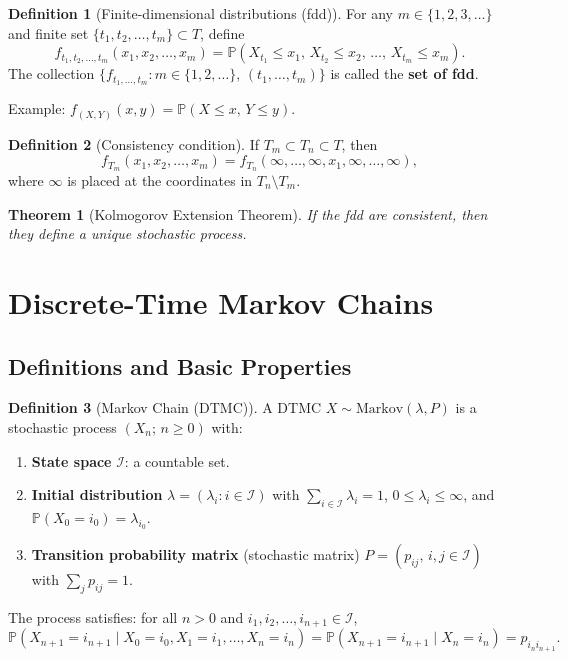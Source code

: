 \documentclass[12pt, a4paper]{article}
\theoremstyle{definition}
\newtheorem{definition}{Definition}[section]
\theoremstyle{plain}
\newtheorem{theorem}{Theorem}[section]
\newcommand{\PP}{\mathbb{P}}
\newcommand{\II}{\mathcal{I}}
\begin{document}
\begin{definition}[Finite-dimensional distributions (fdd)]
For any $m \in \{1,2,3,\ldots\}$ and finite set $\{t_1, t_2, \ldots, t_m\} \subset T$, define
\begin{equation*}
  f_{t_1,t_2,\ldots,t_m}(x_1,x_2,\ldots,x_m) = \PP(X_{t_1} \le x_1,\, X_{t_2} \le x_2,\,\ldots,\, X_{t_m} \le x_m).
\end{equation*}
The collection $\{f_{t_1,\ldots,t_m} : m \in \{1,2,\ldots\},\, (t_1,\ldots,t_m)\}$ is called the \textbf{set of fdd}.

Example: $f_{(X,Y)}(x,y) = \PP(X \le x,\, Y \le y)$.
\end{definition}

\begin{definition}[Consistency condition]
If $T_m \subset T_n \subset T$, then
\begin{equation*}
  f_{T_m}(x_1,x_2,\ldots,x_m) = f_{T_n}(\infty,\ldots,\infty,x_1,\infty,\ldots,\infty),
\end{equation*}
where $\infty$ is placed at the coordinates in $T_n \setminus T_m$.
\end{definition}

\begin{theorem}[Kolmogorov Extension Theorem]
If the fdd are consistent, then they define a unique stochastic process.
\end{theorem}

\section{Discrete-Time Markov Chains}
\subsection{Definitions and Basic Properties}

\begin{definition}[Markov Chain (DTMC)]
A DTMC $X \sim \text{Markov}(\lambda, P)$ is a stochastic process $(X_n;\, n \ge 0)$ with:
\begin{enumerate}[label=(\roman*)]
  \item \textbf{State space} $\II$: a countable set.
  \item \textbf{Initial distribution} $\lambda = (\lambda_i : i \in \II)$ with $\sum_{i \in \II} \lambda_i = 1$, $0 \le \lambda_i \le \infty$, and $\PP(X_0 = i_0) = \lambda_{i_0}$.
  \item \textbf{Transition probability matrix} (stochastic matrix) $P = (p_{ij},\, i,j \in \II)$ with $\sum_j p_{ij} = 1$.
\end{enumerate}
The process satisfies: for all $n > 0$ and $i_1, i_2, \ldots, i_{n+1} \in \II$,
\begin{equation*}
  \PP(X_{n+1} = i_{n+1} \mid X_0 = i_0, X_1 = i_1, \ldots, X_n = i_n)
  = \PP(X_{n+1} = i_{n+1} \mid X_n = i_n) = p_{i_n i_{n+1}}.
\end{equation*}
\end{definition}
\end{document}
